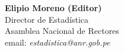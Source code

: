 \begin{center}
\textbf{Elipio Moreno (Editor)}\\
Director de Estadística \\
Asamblea Nacional de Rectores \\
email: \textit{estadistica@anr.gob.pe}\\
\end{center}

